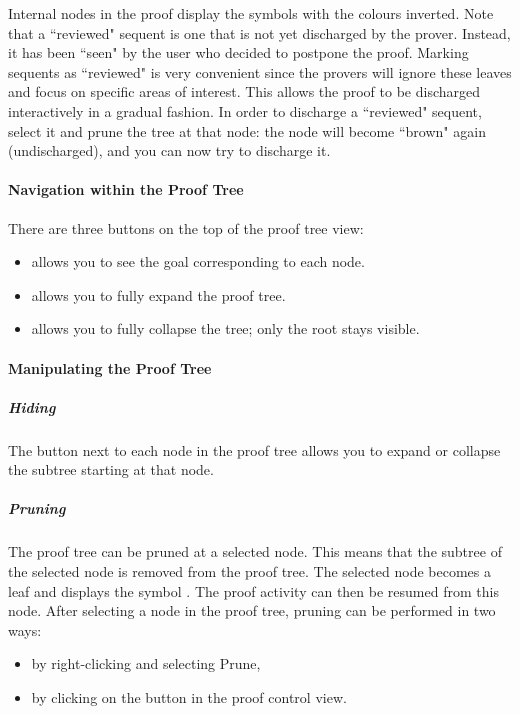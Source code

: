Internal nodes in the proof display the symbols with the colours inverted. Note that a ``reviewed" sequent is one that is not yet discharged by the prover. Instead, it has been ``seen" by the user who decided to postpone the proof. Marking sequents as ``reviewed" is very convenient since the provers will ignore these leaves and focus on specific areas of interest. This allows the proof to be discharged interactively in a gradual fashion. In order to discharge a ``reviewed" sequent, select it and prune the tree at that node: the node will become ``brown" again (undischarged), and you can now try to discharge it. 

\paragraph{Navigation within the Proof Tree}

There are three buttons on the top of the proof tree view:

\begin{itemize}
	\item {} allows you to see the goal corresponding to each node.
	\item {} allows you to fully expand the proof tree.
	\item {} allows you to fully collapse the tree; only the root stays visible. 
\end{itemize}

\paragraph{Manipulating the Proof Tree}

\subparagraph{Hiding}

The button next to each node in the proof tree allows you to expand or collapse the subtree starting at that node. 

\subparagraph{Pruning}

The proof tree can be pruned at a selected node. This means that the subtree of the selected node is removed from the proof tree. The selected node becomes a leaf and displays the symbol . The proof activity can then be resumed from this node. After selecting a node in the proof tree, pruning can be performed in two ways:

\begin{itemize}
	\item by right-clicking and selecting \textsf{Prune},
	\item by clicking on the  button in the proof control view. 
\end{itemize}

